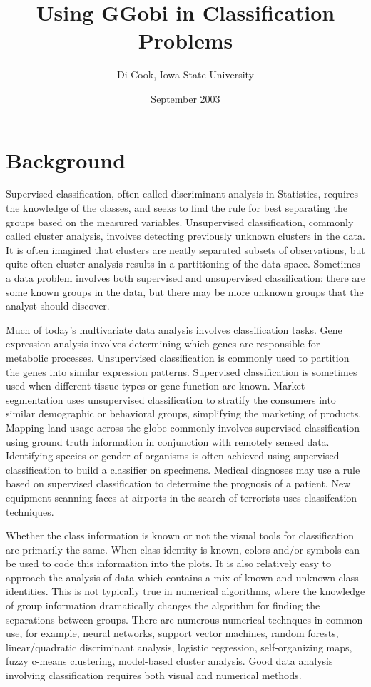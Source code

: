 \documentclass{article}
\begin{document}
\title{Using GGobi in Classification Problems}

\author{Di Cook, Iowa State University}

\date{September 2003}

\maketitle

\section{Background}

Supervised classification, often called discriminant analysis in
Statistics, requires the knowledge of the classes, and seeks to find
the rule for best separating the groups based on the measured
variables. Unsupervised classification, commonly called cluster
analysis, involves detecting previously unknown clusters in the
data. It is often imagined that clusters are neatly separated subsets
of observations, but quite often cluster analysis results in a
partitioning of the data space.  Sometimes a data problem involves
both supervised and unsupervised classification: there are some known
groups in the data, but there may be more unknown groups that the
analyst should discover.

Much of today's multivariate data analysis involves classification
tasks. Gene expression analysis involves determining which genes are
responsible for metabolic processes. Unsupervised classification is
commonly used to partition the genes into similar expression
patterns. Supervised classification is sometimes used when different
tissue types or gene function are known. Market segmentation uses
unsupervised classification to stratify the consumers into similar
demographic or behavioral groups, simplifying the marketing of
products.  Mapping land usage across the globe commonly involves
supervised classification using ground truth information in
conjunction with remotely sensed data. Identifying species or gender
of organisms is often achieved using supervised classification to
build a classifier on specimens. Medical diagnoses may use a rule
based on supervised classification to determine the prognosis of a
patient. New equipment scanning faces at airports in the search of
terrorists uses classifcation techniques.

Whether the class information is known or not the visual tools for
classification are primarily the same. When class identity is known,
colors and/or symbols can be used to code this information into the
plots. It is also relatively easy to approach the analysis of data
which contains a mix of known and unknown class identities. This is
not typically true in numerical algorithms, where the knowledge of
group information dramatically changes the algorithm for finding the
separations between groups. There are numerous numerical technques in
common use, for example, neural networks, support vector machines,
random forests, linear/quadratic discriminant analysis, logistic
regression, self-organizing maps, fuzzy c-means clustering,
model-based cluster analysis. Good data analysis involving
classification requires both visual and numerical methods.
\end{document}
